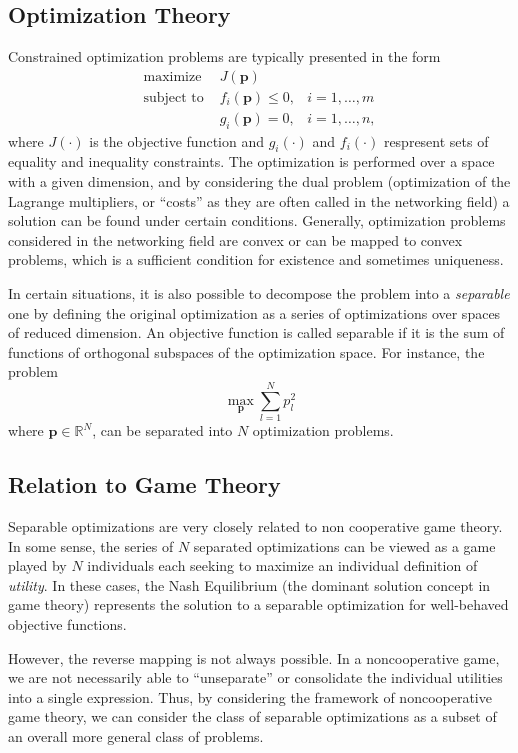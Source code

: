 \documentclass[11pt]{IEEEtran}
\theoremstyle{definition}
\begin{document}
\subsection{Optimization Theory}
Constrained optimization problems are typically presented in the form
\begin{align}
	\text{maximize } &J(\mathbf{p})\nonumber\\
	\text{subject to } &f_i(\mathbf{p})\leq0, & i=1,\ldots,m\nonumber\\
		&g_i(\mathbf{p})=0, & i=1,\ldots,n,\nonumber
\end{align}
where $J(\cdot)$ is the objective function and $g_i(\cdot)$ and $f_i(\cdot)$ respresent sets of equality and inequality constraints. The optimization is performed over a space with a given dimension, and by considering the dual problem (optimization of the Lagrange multipliers, or ``costs'' as they are often called in the networking field) a solution can be found under certain conditions. Generally, optimization problems considered in the networking field are convex or can be mapped to convex problems, which is a sufficient condition for existence and sometimes uniqueness.

In certain situations, it is also possible to decompose the problem into a {\em separable} one by defining the original optimization as a series of optimizations over spaces of reduced dimension. An objective function is called separable if it is the sum of functions of orthogonal subspaces of the optimization space. For instance, the problem
\begin{equation}
	\max_{\mathbf{p}} \sum_{l=1}^{N} p_l^2
\end{equation}
where $\mathbf{p} \in \mathbb{R}^N$, can be separated into $N$ optimization problems.

\subsection{Relation to Game Theory}
Separable optimizations are very closely related to non cooperative game theory. In some sense, the series of $N$ separated optimizations can be viewed as a game played by $N$ individuals each seeking to maximize an individual definition of {\em utility}. In these cases, the Nash Equilibrium (the dominant solution concept in game theory) represents the solution to a separable optimization for well-behaved objective functions. 

However, the reverse mapping is not always possible. In a noncooperative game, we are not necessarily able to ``unseparate'' or consolidate the individual utilities into a single expression. Thus, by considering the framework of noncooperative game theory, we can consider the class of separable optimizations as a subset of an overall more general class of problems. 
\end{document}
